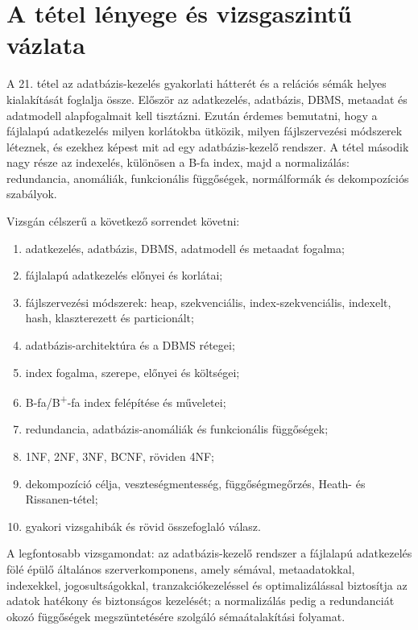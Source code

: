 \section{A tétel lényege és vizsgaszintű vázlata}

\begin{summarybox}
A 21. tétel az adatbázis-kezelés gyakorlati hátterét és a relációs sémák helyes kialakítását foglalja össze. Először az adatkezelés, adatbázis, DBMS, metaadat és adatmodell alapfogalmait kell tisztázni. Ezután érdemes bemutatni, hogy a fájlalapú adatkezelés milyen korlátokba ütközik, milyen fájlszervezési módszerek léteznek, és ezekhez képest mit ad egy adatbázis-kezelő rendszer. A tétel második nagy része az indexelés, különösen a B-fa index, majd a normalizálás: redundancia, anomáliák, funkcionális függőségek, normálformák és dekompozíciós szabályok.
\end{summarybox}

Vizsgán célszerű a következő sorrendet követni:

\begin{enumerate}
  \item adatkezelés, adatbázis, DBMS, adatmodell és metaadat fogalma;
  \item fájlalapú adatkezelés előnyei és korlátai;
  \item fájlszervezési módszerek: heap, szekvenciális, index-szekvenciális, indexelt, hash, klaszterezett és particionált;
  \item adatbázis-architektúra és a DBMS rétegei;
  \item index fogalma, szerepe, előnyei és költségei;
  \item B-fa/B\textsuperscript{+}-fa index felépítése és műveletei;
  \item redundancia, adatbázis-anomáliák és funkcionális függőségek;
  \item 1NF, 2NF, 3NF, BCNF, röviden 4NF;
  \item dekompozíció célja, veszteségmentesség, függőségmegőrzés, Heath- és Rissanen-tétel;
  \item gyakori vizsgahibák és rövid összefoglaló válasz.
\end{enumerate}

A legfontosabb vizsgamondat: az adatbázis-kezelő rendszer a fájlalapú adatkezelés fölé épülő általános szerverkomponens, amely sémával, metaadatokkal, indexekkel, jogosultságokkal, tranzakciókezeléssel és optimalizálással biztosítja az adatok hatékony és biztonságos kezelését; a normalizálás pedig a redundanciát okozó függőségek megszüntetésére szolgáló sémaátalakítási folyamat.

